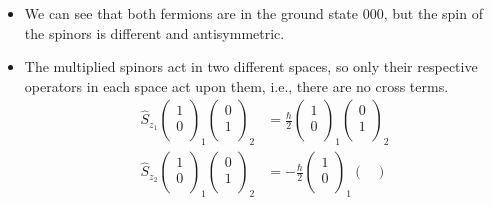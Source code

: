 \documentclass[../notes.tex]{subfiles}
\begin{document}
\begin{itemize}
\begin{itemize}
\begin{itemize}
            \item We can see that both fermions are in the ground state $000$, but the spin of the spinors is different and antisymmetric.
            \item The multiplied spinors act in two different spaces, so only their respective operators in each space act upon them, i.e., there are no cross terms.
            \begin{align*}
                \hat{S}_{z_1}
                \begin{pmatrix}
                    1\\
                    0\\
                \end{pmatrix}_1
                \begin{pmatrix}
                    0\\
                    1\\
                \end{pmatrix}_2
                &= \frac{\hbar}{2}
                \begin{pmatrix}
                    1\\
                    0\\
                \end{pmatrix}_1
                \begin{pmatrix}
                    0\\
                    1\\
                \end{pmatrix}_2\\
                \hat{S}_{z_2}
                \begin{pmatrix}
                    1\\
                    0\\
                \end{pmatrix}_1
                \begin{pmatrix}
                    0\\
                    1\\
                \end{pmatrix}_2
                &= -\frac{\hbar}{2}
                \begin{pmatrix}
                    1\\
                    0\\
                \end{pmatrix}_1
                \begin{pmatrix}

\end{pmatrix}
\end{align*}
\end{itemize}
\end{itemize}
\end{itemize}
\end{document}
